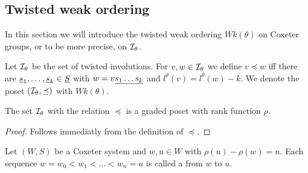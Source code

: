 \subsection{Twisted weak ordering}
\label{sec:twisted-involutions-twisted-weak-ordering}

In this section we will introduce the twisted weak ordering $Wk(\theta)$ on Coxeter groups, or to be more precise, on $\mathcal{I}_{\theta}$.

\begin{defi}
	Let $\mathcal{I}_{\theta}$ be the set of twisted involutions. For $v,w \in \mathcal{I}_{\theta}$ we define $v \preceq w$ iff there are $\underline{s}_1, \ldots, \underline{s}_k \in \underline{S}$ with $w = v \underline{ s_1 \ldots s_k }$ and $l^\theta(v) = l^\theta(w) - k$. We denote the poset $(\mathcal{I}_{\theta},\preceq)$ with $Wk(\theta)$.
\end{defi}

\begin{lemm}
	The set $\mathcal{I}_{\theta}$ with the relation $\preceq$ is a graded poset with rank function $\rho$.

	\begin{proof}
		Follows immediatly from the definition of $\preceq$.
	\end{proof}
\end{lemm}

\begin{defi}
	Let $(W,S)$ be a Coxeter system and $w,u \in W$ with $\rho(u) - \rho(w) = n$. Each sequence $w = w_0 < w_1 < \ldots < w_n = u$ is called a  from $w$ to $u$.
\end{defi}

\todo